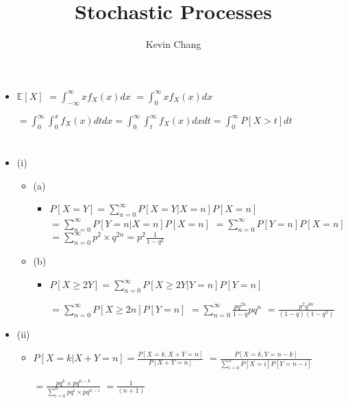 \documentclass[a4paper]{article}
\title{Stochastic Processes}
\author{Kevin Chang}
\begin{document}
\maketitle

\section{}
\begin{itemize}
\begin{figure} [H]
    \texttt{[image: question/1.png]}
\end{figure}
    \item $\mathbb{E}[X]$
        $= \int_{-\infty}^\infty x f_X(x) dx$
        $= \int_0^\infty x f_X(x) dx$

        $= \int_0^\infty \int_0^x f_X(x) dt dx = \int_0^\infty \int_t^\infty f_X(x) dx dt = \int_0^\infty P[X > t] dt$
\end{itemize}

\section{}
\begin{itemize}
\begin{figure} [H]
    \texttt{[image: question/2.png]}
\end{figure}
    \item (i)
        \begin{itemize}
            \item (a)
                \begin{itemize}
                    \item $P[X=Y] = \sum_{n = 0}^\infty P[X=Y|X=n]P[X=n]$
                        $= \sum_{n = 0}^\infty P[Y=n|X=n]P[X=n]$
                        $= \sum_{n = 0}^\infty P[Y=n]P[X=n]$
                        $= \sum_{n = 0}^\infty p^2 \times q^{2n} = p^2 \frac{1}{1-q^2}$
                \end{itemize}
            \item (b)
                \begin{itemize}
                    \item $P[X\geq 2Y] = \sum_{n = 0}^\infty P[X\geq 2Y|Y=n]P[Y=n]$

                        $= \sum_{n = 0}^\infty P[X \geq 2n]P[Y=n]$
                        $= \sum_{n = 0}^\infty \frac{pq^{2n}}{1-q} pq^n$
                        $= \frac{p^2 q^{3n}}{(1-q)(1-q^3)}$
                \end{itemize}
        \end{itemize}
    \item (ii)
        \begin{itemize}
            \item $P[X=k|X+Y=n] = \frac{P[X=k, X+Y = n]}{P[X+Y=n]}$
                $= \frac{P[X=k, Y = n-k]}{\sum_{i=0}^nP[X=i] P[Y=n-i]}$

                $= \frac{pq^k \times pq^{n-k}}{\sum_{i=0}^n pq^i \times pq^{n-i}}$
                $= \frac{1}{(n+1)}$
        \end{itemize}
\end{itemize}
\end{document}
